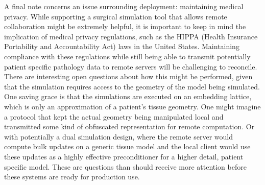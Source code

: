 A final note concerns an issue surrounding deployment: maintaining
medical privacy. While supporting a surgical simulation tool that
allows remote collaboration might be extremely helpful, it is
important to keep in mind the implication of medical privacy
regulations, such as the HIPPA (Health Insurance Portability and
Accountability Act) laws in the United States. Maintaining compliance
with these regulations while still being able to transmit potentially
patient specific pathology data to remote servers will be challenging
to reconcile. There are interesting open questions about how this
might be performed, given that the simulation requires access to the
geometry of the model being simulated. One saving grace is that the
simulations are executed on an embedding lattice, which is only an
approximation of a patient's tissue geometry. One might imagine a
protocol that kept the actual geometry being manipulated local and
transmitted some kind of obfuscated representation for remote
computation. Or with potentially a dual simulation design, where the
remote server would compute bulk updates on a generic tissue model and
the local client would use these updates as a highly effective
preconditioner for a higher detail, patient specific model. These are
questions than should receive more attention before these systems are
ready for production use.





